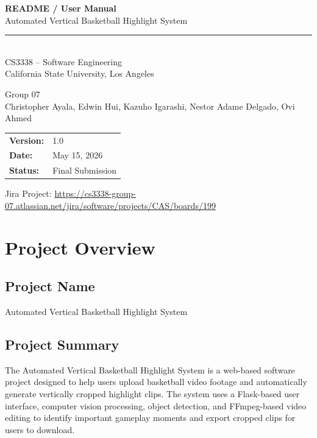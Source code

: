 \documentclass[12pt]{article}
\begin{document}
\begin{titlepage}
    \centering
    \vspace*{2cm}

    {\LARGE\bfseries README / User Manual\\[0.5em]}
    {\Large Automated Vertical Basketball Highlight System\\[2em]}

    \rule{\linewidth}{0.5pt}\\[1em]

    {\large CS3338 -- Software Engineering\\
    California State University, Los Angeles\\[1em]}

    {\large Group 07\\[2em]}
    {\normalsize Christopher Ayala, Edwin Hui, Kazuho Igarashi, Nestor Adame Delgado, Ovi Ahmed\\[2em]}

    \begin{tabular}{ll}
        \textbf{Version:}  & 1.0                   \\
        \textbf{Date:}     & May 15, 2026                \\
        \textbf{Status:}   & Final Submission \\
    \end{tabular}

    \vfill
    {\small Jira Project: \href{https://cs3338-group-07.atlassian.net/jira/software/projects/CAS/boards/199}{https://cs3338-group-07.atlassian.net/jira/software/projects/CAS/boards/199}}
\end{titlepage}

\newpage
\tableofcontents
\newpage

\section{Project Overview}

\subsection{Project Name}
Automated Vertical Basketball Highlight System

\subsection{Project Summary}
The Automated Vertical Basketball Highlight System is a web-based software project designed to help users upload basketball video footage and automatically generate vertically cropped highlight clips. The system uses a Flask-based user interface, computer vision processing, object detection, and FFmpeg-based video editing to identify important gameplay moments and export cropped clips for users to download.
\end{document}
